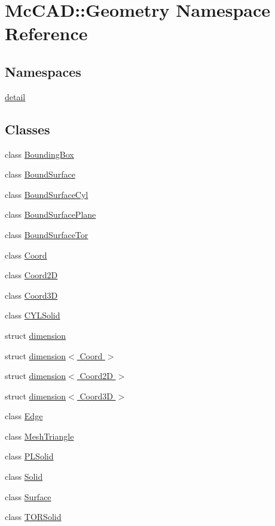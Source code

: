 \hypertarget{namespaceMcCAD_1_1Geometry}{}\section{Mc\+C\+AD\+:\+:Geometry Namespace Reference}
\label{namespaceMcCAD_1_1Geometry}
\subsection*{Namespaces}
\begin{DoxyCompactItemize}
\item 
 \hyperlink{namespaceMcCAD_1_1Geometry_1_1detail}{detail}
\end{DoxyCompactItemize}
\subsection*{Classes}
\begin{DoxyCompactItemize}
\item 
class \hyperlink{classMcCAD_1_1Geometry_1_1BoundingBox}{Bounding\+Box}
\item 
class \hyperlink{classMcCAD_1_1Geometry_1_1BoundSurface}{Bound\+Surface}
\item 
class \hyperlink{classMcCAD_1_1Geometry_1_1BoundSurfaceCyl}{Bound\+Surface\+Cyl}
\item 
class \hyperlink{classMcCAD_1_1Geometry_1_1BoundSurfacePlane}{Bound\+Surface\+Plane}
\item 
class \hyperlink{classMcCAD_1_1Geometry_1_1BoundSurfaceTor}{Bound\+Surface\+Tor}
\item 
class \hyperlink{classMcCAD_1_1Geometry_1_1Coord}{Coord}
\item 
class \hyperlink{classMcCAD_1_1Geometry_1_1Coord2D}{Coord2D}
\item 
class \hyperlink{classMcCAD_1_1Geometry_1_1Coord3D}{Coord3D}
\item 
class \hyperlink{classMcCAD_1_1Geometry_1_1CYLSolid}{C\+Y\+L\+Solid}
\item 
struct \hyperlink{structMcCAD_1_1Geometry_1_1dimension}{dimension}
\item 
struct \hyperlink{structMcCAD_1_1Geometry_1_1dimension_3_01Coord_01_4}{dimension$<$ Coord $>$}
\item 
struct \hyperlink{structMcCAD_1_1Geometry_1_1dimension_3_01Coord2D_01_4}{dimension$<$ Coord2\+D $>$}
\item 
struct \hyperlink{structMcCAD_1_1Geometry_1_1dimension_3_01Coord3D_01_4}{dimension$<$ Coord3\+D $>$}
\item 
class \hyperlink{classMcCAD_1_1Geometry_1_1Edge}{Edge}
\item 
class \hyperlink{classMcCAD_1_1Geometry_1_1MeshTriangle}{Mesh\+Triangle}
\item 
class \hyperlink{classMcCAD_1_1Geometry_1_1PLSolid}{P\+L\+Solid}
\item 
class \hyperlink{classMcCAD_1_1Geometry_1_1Solid}{Solid}
\item 
class \hyperlink{classMcCAD_1_1Geometry_1_1Surface}{Surface}
\item 
class \hyperlink{classMcCAD_1_1Geometry_1_1TORSolid}{T\+O\+R\+Solid}
\end{DoxyCompactItemize}
